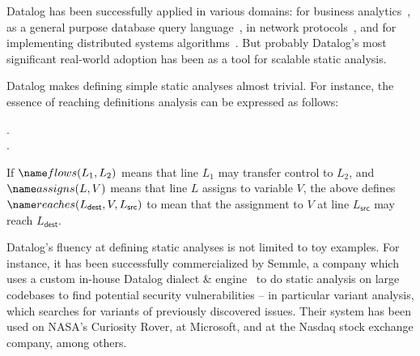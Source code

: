 
Datalog has been successfully applied in various domains: for business analytics~\citep{logicblox}, as a general purpose database query language~\citep{datomic}, in network protocols~\citep{DBLP:journals/cacm/LooCGGHMRRS09,dedalus}, and for implementing distributed systems algorithms~\citep{bloom,DBLP:conf/cloud/ConwayMAHM12}.
%
But probably Datalog's most significant real-world adoption has been as a tool for scalable static analysis.

Datalog makes defining simple static analyses almost trivial. For instance, the
essence of reaching definitions analysis can be expressed as follows:

\begin{datalog}
   \gets {}.
  \\
  \gets
  \neg{}
  \conj
  \conj
  .
\end{datalog}

\noindent
If $\atom{flows}{L_1, L_2}$ means that line $L_1$ may transfer control to $L_2$,
and $\atom{assigns}{L, V}$ means that line $L$ assigns to variable $V$, the
above defines $\atom{reaches}{L_{\textsf{dest}}, V, L_{\textsf{src}}}$
to mean that the assignment to $V$ at line $L_{\textsf{src}}$ may reach
$L_{\textsf{dest}}$. 

Datalog's fluency at defining static analyses is not limited to toy examples.
%
For instance, it has been successfully commercialized by Semmle, a company which
uses a custom in-house Datalog dialect \& engine~\citep{DBLP:conf/ecoop/AvgustinovMJS16} to do static
analysis on large codebases to find potential security vulnerabilities -- in
particular variant analysis, which searches for variants of previously
discovered issues.
%
Their system has been used on NASA's Curiosity Rover, at Microsoft, and at the
Nasdaq stock exchange company, among others.
%
%


